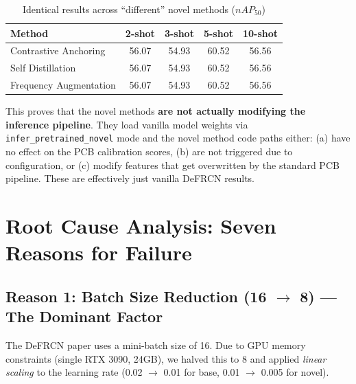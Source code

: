 \documentclass[11pt,a4paper]{article}
\begin{document}
\begin{table}[h]
\centering
\caption{Identical results across ``different'' novel methods ($nAP_{50}$)}
\begin{tabular}{lcccc}
\toprule
Method & 2-shot & 3-shot & 5-shot & 10-shot \\
\midrule
Contrastive Anchoring & 56.07 & 54.93 & 60.52 & 56.56 \\
Self Distillation & 56.07 & 54.93 & 60.52 & 56.56 \\
Frequency Augmentation & 56.07 & 54.93 & 60.52 & 56.56 \\
\bottomrule
\end{tabular}
\label{tab:identical}
\end{table}

This proves that the novel methods \textbf{are not actually modifying the inference pipeline}. They load vanilla model weights via \texttt{infer\_pretrained\_novel} mode and the novel method code paths either: (a) have no effect on the PCB calibration scores, (b) are not triggered due to configuration, or (c) modify features that get overwritten by the standard PCB pipeline. These are effectively just vanilla DeFRCN results.

\section{Root Cause Analysis: Seven Reasons for Failure}

\subsection{Reason 1: Batch Size Reduction (16 $\rightarrow$ 8) --- The Dominant Factor}

The DeFRCN paper uses a mini-batch size of 16. Due to GPU memory constraints (single RTX 3090, 24GB), we halved this to 8 and applied \textit{linear scaling} to the learning rate (0.02 $\rightarrow$ 0.01 for base, 0.01 $\rightarrow$ 0.005 for novel).
\end{document}
